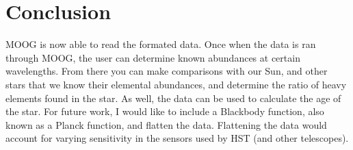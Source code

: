 \section{Conclusion}
MOOG is now able to read the formated data. Once when the data is ran through MOOG, the user can determine known abundances at certain wavelengths.
From there you can make comparisons with our Sun, and other stars that we know their elemental abundances, and determine the ratio of heavy elements found in the star. As well, the data can be used to calculate the age of the star. For future work, I would like to include a Blackbody function, also known as a Planck function, and flatten the data. Flattening the data would account for varying sensitivity in the sensors used by HST (and other telescopes).  
